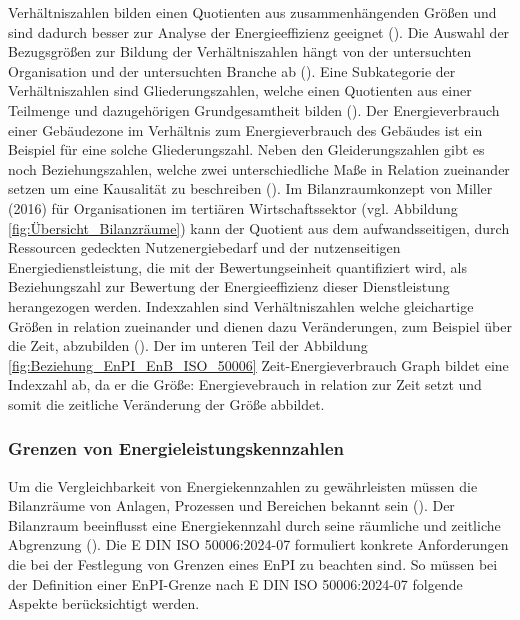 Verhältniszahlen bilden einen Quotienten aus zusammenhängenden Größen und sind dadurch besser zur Analyse der Energieeffizienz geeignet (\cite[S. 3]{Hohnhold.2013}).
Die Auswahl der Bezugsgrößen zur Bildung der Verhältniszahlen hängt von der untersuchten Organisation und der untersuchten Branche ab (\cite[S. 3]{Hohnhold.2013}). 
Eine Subkategorie der Verhältniszahlen sind Gliederungszahlen, welche einen Quotienten aus einer Teilmenge und dazugehörigen Grundgesamtheit bilden (\cite[S. 3]{Hohnhold.2013}).
Der Energieverbrauch einer Gebäudezone im Verhältnis zum Energieverbrauch des Gebäudes ist ein Beispiel für eine solche Gliederungszahl.
Neben den Gleiderungszahlen gibt es noch Beziehungszahlen, welche zwei unterschiedliche Maße in Relation zueinander setzen um eine Kausalität zu beschreiben (\cite[S. 3]{Hohnhold.2013}).
Im Bilanzraumkonzept von Miller (2016) für Organisationen im tertiären Wirtschaftssektor (vgl. Abbildung \eqref{fig:Übersicht_Bilanzräume}) kann der Quotient aus 
dem aufwandsseitigen, durch Ressourcen gedeckten Nutzenergiebedarf und der nutzenseitigen Energiedienstleistung, die mit der Bewertungseinheit quantifiziert wird, 
als Beziehungszahl zur Bewertung der Energieeffizienz dieser Dienstleistung herangezogen werden.
Indexzahlen sind Verhältniszahlen welche gleichartige Größen in relation zueinander und dienen dazu Veränderungen, zum Beispiel über die Zeit, abzubilden (\cite[S. 3f.]{Hohnhold.2013}).
Der im unteren Teil der Abbildung \eqref{fig:Beziehung_EnPI_EnB_ISO_50006} Zeit-Energieverbrauch Graph bildet eine Indexzahl ab, da er die Größe: Energievebrauch in relation zur 
Zeit setzt und somit die zeitliche Veränderung der Größe abbildet.

\subsubsection{Grenzen von Energieleistungskennzahlen}
Um die Vergleichbarkeit von Energiekennzahlen zu gewährleisten müssen die Bilanzräume von Anlagen, Prozessen und Bereichen bekannt sein (\cite[S. 310]{Engelmann.2015}).
Der Bilanzraum beeinflusst eine Energiekennzahl durch seine räumliche und zeitliche Abgrenzung (\cite[S. 6]{Hohnhold.2013}).
Die E DIN ISO 50006:2024-07 formuliert konkrete Anforderungen die bei der Festlegung von Grenzen eines EnPI zu beachten sind.
So müssen bei der Definition einer EnPI-Grenze nach E DIN ISO 50006:2024-07 folgende Aspekte berücksichtigt werden.

